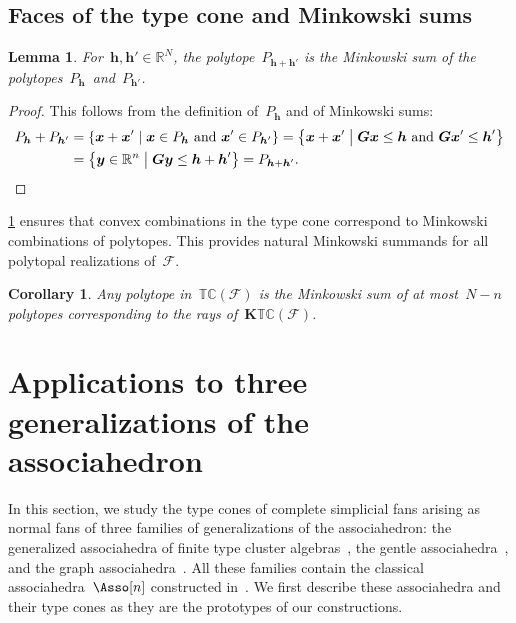 \documentclass{amsart}
\newtheorem{corollary}[theorem]{Corollary}
\newtheorem{lemma}[theorem]{Lemma}
\theoremstyle{definition}
\newcommand{\R}{\mathbb{R}} %
\renewcommand{\b}[1]{{\boldsymbol{#1}}} %
\newcommand{\set}[2]{\left\{ #1 \;\middle|\; #2 \right\}} %
\newcommand{\Fan}{\mathcal{F}} %
\newcommand{\typeCone}{\mathbb{TC}} %
\begin{document}
\subsection{Faces of the type cone and Minkowski sums}

\begin{lemma}
\label{lem:MinkowskiSum}
For~$\b{h}, \b{h}' \! \in \R^N$, the polytope~$P_{\b{h} + \b{h'}}$ is the Minkowski sum of the polytopes~$P_\b{h}$~and~$P_{\b{h}'}$.
\end{lemma}

\begin{proof}
This follows from the definition of~$P_\b{h}$ and of Minkowski sums:
\begin{align*}
P_\b{h} + P_{\b{h}'} & = \set{\b{x} + \b{x}'}{\b{x} \in P_\b{h} \text{ and } \b{x}' \in P_{\b{h}'}} = \set{\b{x} + \b{x}'}{\b{G}\b{x} \le \b{h} \text{ and } \b{G}\b{x}' \le \b{h}'} \\
& = \set{\b{y} \in \R^n}{\b{G}\b{y} \le \b{h} + \b{h}'} = P_{\b{h} + \b{h}'}.
\qedhere
\end{align*}
\end{proof}

\cref{lem:MinkowskiSum} ensures that convex combinations in the type cone correspond to Minkowski combinations of polytopes. This provides natural Minkowski summands for all polytopal realizations of~$\Fan$.

\begin{corollary}
Any polytope in~$\typeCone(\Fan)$ is the Minkowski sum of at most~$N-n$ polytopes corresponding to the rays of~$\b{K}\typeCone(\Fan)$.
\end{corollary}


\section{Applications to three generalizations of the associahedron}
\label{sec:applications}

In this section, we study the type cones of complete simplicial fans arising as normal fans of three families of generalizations of the associahedron: the generalized associahedra of finite type cluster algebras~\cite{FominZelevinsky-ClusterAlgebrasI, FominZelevinsky-ClusterAlgebrasII, FominZelevinsky-ClusterAlgebrasIV, HohlwegLangeThomas, HohlwegPilaudStella}, the gentle associahedra~\cite{PaluPilaudPlamondon-nonkissing}, and the graph associahedra~\cite{CarrDevadoss, Postnikov, FeichtnerSturmfels, Zelevinsky}. 
All these families contain the classical associahedra~$\Asso[n]$ constructed in~\cite{ShniderSternberg, Loday}.
We first describe these associahedra and their type cones as they are the prototypes of our constructions.
\end{document}
